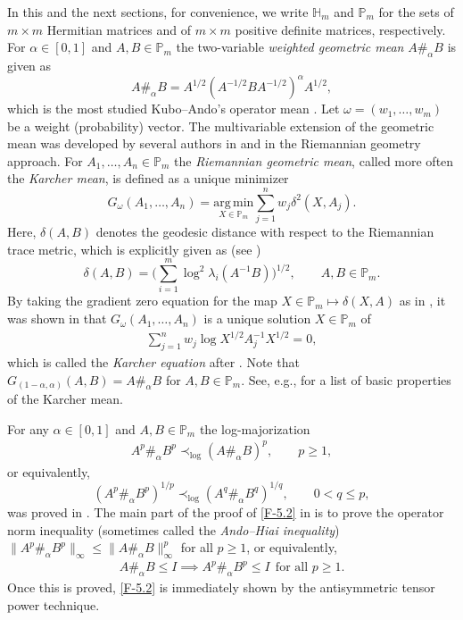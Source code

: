 \documentclass[11pt,reqno]{article}
\numberwithin{equation}{section}
\def\bH{\mathbb{H}}
\def\bP{\mathbb{P}}
\begin{document}
In this and the next sections, for convenience, we write $\bH_m$ and $\bP_m$ for the sets of $m\times m$
Hermitian matrices and of $m\times m$ positive definite matrices, respectively. For $\alpha\in[0,1]$ and
$A,B\in\bP_m$ the two-variable \emph{weighted geometric mean} $A\#_\alpha B$ is given as
\[
A\#_\alpha B=A^{1/2}(A^{-1/2}BA^{-1/2})^\alpha A^{1/2},
\]
which is the most studied Kubo--Ando's operator mean \cite{KA}. Let $\omega=(w_1,\dots,w_m)$ be a
weight (probability) vector. The multivariable extension of the geometric mean was developed by several
authors in \cite{BH,Mo} and \cite{LL1,LL2} in the Riemannian geometry approach. For $A_1,\dots,A_n\in\bP_m$
the \emph{Riemannian geometric mean}, called more often the \emph{Karcher mean}, is defined as a unique
minimizer
\[
G_\omega(A_1,\dots,A_n)=\underset{X\in\bP_m}{\mathrm{arg\,min}}
\sum_{j=1}^nw_j\delta^2(X,A_j).
\]
Here, $\delta(A,B)$ denotes the geodesic distance with respect to the Riemannian trace metric, which is
explicitly given as (see \cite{BH,Mo})
\[
\delta(A,B)=\Biggl(\sum_{i=1}^m\log^2\lambda_i(A^{-1}B)\Biggr)^{1/2},\qquad A,B\in\bP_m.
\]
By taking the gradient zero equation for the map $X\in\bP_m\mapsto\delta(X,A)$ as in \cite{Kar}, it was
shown in \cite{BH,Mo} that $G_\omega(A_1,\dots,A_n)$ is a unique solution $X\in\bP_m$ of
\begin{align}\label{F-5.1}
\sum_{j=1}^nw_j\log X^{1/2}A_j^{-1}X^{1/2}=0,
\end{align}
which is called the \emph{Karcher equation} after \cite{Kar}. Note that
$G_{(1-\alpha,\alpha)}(A,B)=A\#_\alpha B$ for $A,B\in\bP_m$. See, e.g., \cite{LL1} for a list of basic properties
of the Karcher mean.

For any $\alpha\in[0,1]$ and $A,B\in\bP_m$ the log-majorization
\begin{align}\label{F-5.2}
A^p\#_\alpha B^p\prec_{\log}(A\#_\alpha B)^p,\qquad p\ge1,
\end{align}
or equivalently,
\[
(A^p\#_\alpha B^p)^{1/p}\prec_{\log}(A^q\#_\alpha B^q)^{1/q},\qquad0<q\le p,
\]
was proved in \cite{AH}. The main part of the proof of \eqref{F-5.2} in \cite{AH} is to prove the operator
norm inequality (sometimes called the \emph{Ando--Hiai inequality})
$\|A^p\#_\alpha B^p\|_\infty\le\|A\#_\alpha B\|_\infty^p$ for all $p\ge1$, or equivalently,
\begin{align}\label{F-5.3}
A\#_\alpha B\le I \implies A^p\#_\alpha B^p\le I\ \ \mbox{for all $p\ge1$}.
\end{align}
Once this is proved, \eqref{F-5.2} is immediately shown by the antisymmetric tensor power technique.
\end{document}
